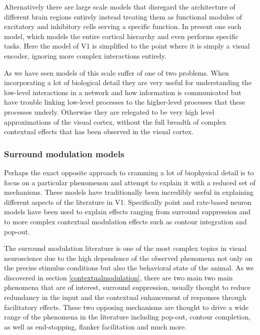 Alternatively there are large scale models that disregard the
architecture of different brain regions entirely instead treating them
as functional modules of excitatory and inhibitory cells serving a
specific function. In \cite{Eliasmith2012} present one such model,
which models the entire cortical hierarchy and even performs specific
tasks. Here the model of V1 is simplified to the point where it is
simply a visual encoder, ignoring more complex interactions entirely.

As we have seen models of this scale suffer of one of two
problems. When incorporating a lot of biological detail they are very
useful for understanding the low-level interactions in a network and
how information is communicated but have trouble linking low-level
processes to the higher-level processes that these processes
underly. Otherwise they are relegated to be very high level
approximations of the visual cortex, without the full breadth of
complex contextual effects that has been observed in the visual
cortex.

\subsubsection{Surround modulation models} \label{SRmodels}

Perhaps the exact opposite approach to cramming a lot of biophysical
detail is to focus on a particular phenomenon and attempt to explain
it with a reduced set of mechanisms. These models have traditionally
been incredibly useful in explaining different aspects of the
literature in V1. Specifically point and rate-based neuron models have
been used to explain effects ranging from surround suppression and to
more complex contextual modulation effects such as contour integration
and pop-out.

The surround modulation literature is one of the most complex topics
in visual neuroscience due to the high dependence of the observed
phenomena not only on the precise stimulus conditions but also the
behavioral state of the animal. As we discovered in section
\ref{contextualmodulation}, there are two main two main phenomena that
are of interest, surround suppression, usually thought to reduce
redundancy in the input and the contextual enhancement of responses
through facilitatory effects. These two opposing mechanisms are
thought to drive a wide range of the phenomena in the literature
including pop-out, contour completion, as well as end-stopping,
flanker facilitation and much more.

